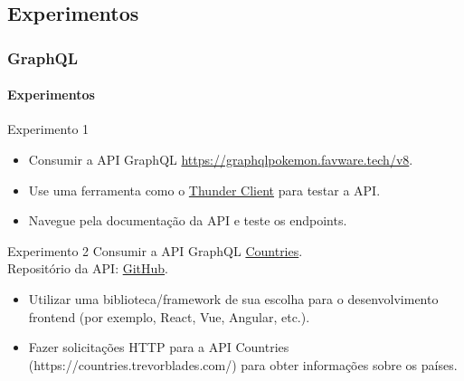 \documentclass[
	9pt, %
	t, %
]{beamer}
\begin{document}
\subsection{Experimentos}

\begin{frame}
	\frametitle{GraphQL}
	\framesubtitle{Experimentos}
	{\small 
	\begin{block}{Experimento 1}
		\begin{itemize}
			\item Consumir a API GraphQL \href{https://graphqlpokemon.favware.tech/v8}{https://graphqlpokemon.favware.tech/v8}.
			\item Use uma ferramenta como o \href{https://www.thunderclient.com/}{Thunder Client} para testar a API.
			\item Navegue pela documentação da API e teste os endpoints.
		\end{itemize}
	\end{block}

	\begin{block}{Experimento 2}
		Consumir a API GraphQL \href{https://countries.trevorblades.com/}{Countries}. \\
		Repositório da API: \href{https://github.com/trevorblades/countries}{GitHub}.
		\begin{itemize}
			\item Utilizar uma biblioteca/framework de sua escolha para o desenvolvimento frontend (por exemplo, React, Vue, Angular, etc.).
			\item Fazer solicitações HTTP para a API Countries (https://countries.trevorblades.com/) para obter informações sobre os países.
		\end{itemize}
	\end{block}
	}

\end{frame}
\end{document}
